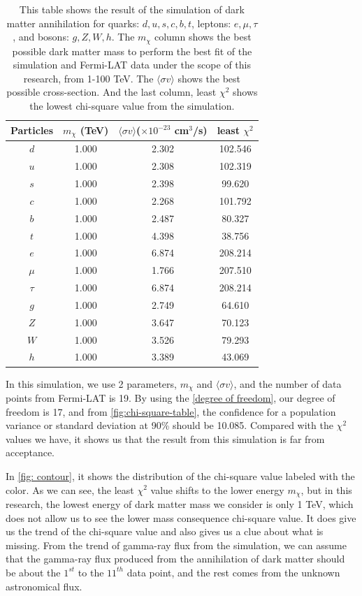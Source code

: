 \documentclass[10pt, oneside]{book}
\numberwithin{equation}{chapter}
\begin{document}
\begin{table}[h]
    \centering
    \begin{tabular}{|c|c|c|c|}
        \hline
        Particles & $m_\chi$ (TeV) & $\langle\sigma v\rangle$($\times10^{-23}$ cm$^3$/s) & least $\chi^2$ \\
        \hline
         $d$ & 1.000 & 2.302 & 102.546\\
         $u$ & 1.000 & 2.308 & 102.319\\
         $s$ & 1.000 & 2.398 & 99.620\\
         $c$ & 1.000 & 2.268 & 101.792\\
         $b$ & 1.000 & 2.487 & 80.327\\
         $t$ & 1.000 & 4.398 & 38.756\\
         $e$ & 1.000 & 6.874 & 208.214\\
         $\mu$ & 1.000 & 1.766 & 207.510\\
         $\tau$ & 1.000 & 6.874 & 208.214\\
         $g$ & 1.000 & 2.749 & 64.610\\
         $Z$ & 1.000 & 3.647 & 70.123\\
         $W$ & 1.000 & 3.526 & 79.293\\
         $h$ & 1.000 & 3.389 & 43.069\\
         \hline
    \end{tabular}
    \caption{This table shows the result of the simulation of dark matter annihilation for quarks: $d, u,s,c,b,t$, leptons: $e, \mu, \tau$, and bosons: $g, Z, W, h$. The $m_\chi$ column shows the best possible dark matter mass to perform the best fit of the simulation and Fermi-LAT data under the scope of this research, from 1-100 TeV. The $\langle \sigma v \rangle$ shows the best possible cross-section. And the last column, least $\chi^2$ shows the lowest chi-square value from the simulation.}
    \label{tab: best fit}
\end{table}

In this simulation, we use 2 parameters, $m_\chi$ and $\langle \sigma v \rangle$, and the number of data points from Fermi-LAT is 19. By using the \autoref{degree of freedom}, our degree of freedom is 17, and from \autoref{fig:chi-square-table}, the confidence for a population variance or standard deviation at 90\% should be 10.085. Compared with the $\chi^2$ values we have, it shows us that the result from this simulation is far from acceptance.

In \autoref{fig: contour}, it shows the distribution of the chi-square value labeled with the color. As we can see, the least $\chi^2$ value shifts to the lower energy $m_\chi$, but in this research, the lowest energy of dark matter mass we consider is only 1 TeV, which does not allow us to see the lower mass consequence chi-square value. It does give us the trend of the chi-square value and also gives us a clue about what is missing. From the trend of gamma-ray flux from the simulation, we can assume that the gamma-ray flux produced from the annihilation of dark matter should be about the $1^{st}$ to the $11^{th}$ data point, and the rest comes from the unknown astronomical flux.
\end{document}
